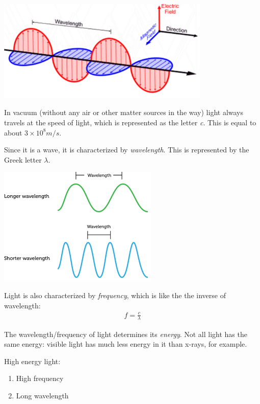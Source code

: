 \documentclass[12pt]{article}
\begin{document}
\begin{center}
\includegraphics[width=4in]{../images/EMWAVE.png}
\end{center}

In vacuum (without any air or other matter sources in the way) light always travels at the speed of light, which is represented as the letter \textit{c}. This is equal to about $3\times 10^8 m/s$.

Since it is a wave, it is characterized by \textit{wavelength}. This is represented by the Greek letter $\lambda$.

\begin{center}
\includegraphics[width=3in]{../images/wavelengths.png}
\end{center}

Light is also characterized by \textit{frequency}, which is like the the inverse of wavelength:
\begin{eqnarray}
f = \frac{c}{\lambda} \nonumber
\end{eqnarray}

The wavelength/frequency of light determines its \textit{energy}. Not all light has the same energy: visible light has much less energy in it than x-rays, for example.

\noindent High energy light:
	\begin{enumerate}
		\item High frequency
		\item Long wavelength
	\end{enumerate}
	
\end{document}
